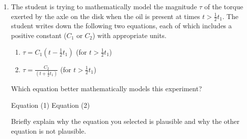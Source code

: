 \documentclass{../../../oss-apphys}
\begin{document}
\begin{enumerate}
\begin{enumerate}[leftmargin=15pt]
   \item The student is trying to mathematically model the magnitude $\tau$ of
     the torque exerted by the axle on the disk when the oil is present at
     times $\displaystyle t>\frac12t_1$. The student writes down the following
     two equations, each of which includes a positive constant ($C_1$ or $C_2$)
     with appropriate units.
     \begin{enumerate}[label={(\arabic*)},leftmargin=15pt]
     \item$\displaystyle\tau=C_1\left(t-\frac12t_1\right)$ (for $t>\frac12 t_1$)
     \item$\displaystyle\tau=\frac{C_2}{\left(t+\frac12t_1\right)}$ (for
       $t>\frac12t_1$)
     \end{enumerate}
     Which equation better mathematically models this experiment?

     \vspace{.1in}
     \underline{\hspace{.3in}}Equation (1)\hspace{.2in}
     \underline{\hspace{.3in}}Equation (2)
     
     \vspace{.1in}Briefly explain why the equation you selected is plausible
     and why the other equation is not plausible.
  \end{enumerate}
\end{enumerate}
\end{document}

